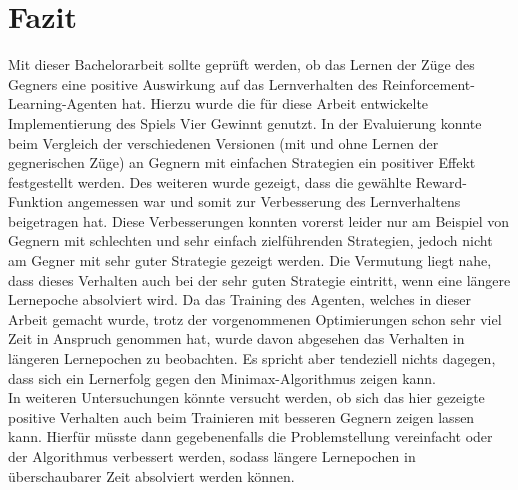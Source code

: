 \chapter{Fazit}%

\label{cha:Fazit}


Mit dieser Bachelorarbeit sollte geprüft werden, ob das Lernen der Züge des Gegners eine positive Auswirkung auf das Lernverhalten des Reinforcement-Learning-Agenten hat.
Hierzu wurde die für diese Arbeit entwickelte Implementierung des Spiels Vier Gewinnt genutzt. In der Evaluierung konnte beim Vergleich der verschiedenen Versionen (mit und ohne Lernen der gegnerischen Züge) an Gegnern mit einfachen Strategien ein positiver Effekt festgestellt werden. Des weiteren wurde gezeigt, dass die  gewählte Reward-Funktion angemessen war und somit zur Verbesserung des Lernverhaltens beigetragen hat.
Diese Verbesserungen konnten vorerst leider nur am Beispiel von Gegnern mit schlechten und sehr einfach zielführenden Strategien, jedoch nicht am Gegner mit sehr guter Strategie gezeigt werden.
Die Vermutung liegt nahe, dass dieses Verhalten auch bei der sehr guten Strategie eintritt, wenn eine längere Lernepoche absolviert wird.
Da das Training des Agenten, welches in dieser Arbeit gemacht wurde, trotz der vorgenommenen Optimierungen schon sehr viel Zeit in Anspruch genommen hat, wurde davon abgesehen das Verhalten in längeren Lernepochen zu beobachten. Es spricht aber tendeziell nichts dagegen, dass sich ein Lernerfolg gegen den Minimax-Algorithmus zeigen kann.\\

In weiteren Untersuchungen könnte versucht werden, ob sich das hier gezeigte positive Verhalten auch beim Trainieren mit besseren Gegnern zeigen lassen kann. 
Hierfür müsste dann gegebenenfalls die Problemstellung vereinfacht oder der Algorithmus verbessert werden, sodass längere Lernepochen in überschaubarer Zeit absolviert werden können.




